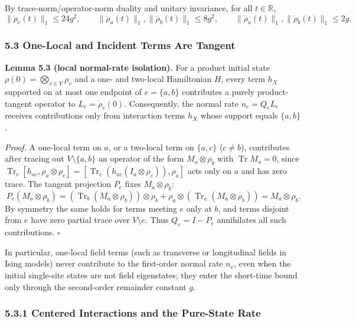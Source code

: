 \documentclass[
  11pt,
]{article}
\begin{document}
By trace-norm/operator-norm duality and unitary invariance, for all \(t\in\mathbb R\),
\[
\lVert\ddot\rho_e(t)\rVert_1\le24g^2,
\qquad
\lVert\ddot\rho_a(t)\rVert_1,
\lVert\ddot\rho_b(t)\rVert_1\le8g^2,
\qquad
\lVert\dot\rho_a(t)\rVert_1,
\lVert\dot\rho_b(t)\rVert_1\le2g.
\]

\subsubsection{5.3 One-Local and Incident Terms Are Tangent}\label{one-local-and-incident-terms-are-tangent}

\textbf{Lemma 5.3 (local normal-rate isolation).} For a product initial state \(\rho(0)=\bigotimes_{v\in V}\rho_v\) and a one- and two-local Hamiltonian \(H\), every term \(h_X\) supported on at most one endpoint of \(e=\{a,b\}\) contributes a purely product-tangent operator to \(L_e = \dot\rho_e(0)\). Consequently, the normal rate \(n_e = Q_e L_e\) receives contributions only from interaction terms \(h_X\) whose support equals \(\{a,b\}\).

\emph{Proof.} A one-local term on \(a\), or a two-local term on \(\{a,c\}\) (\(c\ne b\)), contributes after tracing out \(V\setminus\{a,b\}\) an operator of the form \(M_a\otimes\rho_b\) with \(\operatorname{Tr}M_a=0\), since \(\operatorname{Tr}_c[h_{ac},\rho_a\otimes\rho_c] = [\operatorname{Tr}_c(h_{ac}(I_a\otimes\rho_c)),\rho_a]\) acts only on \(a\) and has zero trace. The tangent projection \(P_e\) fixes \(M_a\otimes\rho_b\):
\[
P_e(M_a\otimes\rho_b)=(\operatorname{Tr}_b(M_a\otimes\rho_b))\otimes\rho_b + \rho_a\otimes(\operatorname{Tr}_a(M_a\otimes\rho_b)) = M_a\otimes\rho_b.
\]
By symmetry the same holds for terms meeting \(e\) only at \(b\), and terms disjoint from \(e\) have zero partial trace over \(V\setminus e\). Thus \(Q_e = I - P_e\) annihilates all such contributions. \(\square\)

In particular, one-local field terms (such as transverse or longitudinal fields in Ising models) never contribute to the first-order normal rate \(n_e\), even when the initial single-site states are not field eigenstates; they enter the short-time bound only through the second-order remainder constant \(g\).

\subsubsection{5.3.1 Centered Interactions and the Pure-State Rate}\label{centered-interactions-and-the-pure-state-rate}
\end{document}
